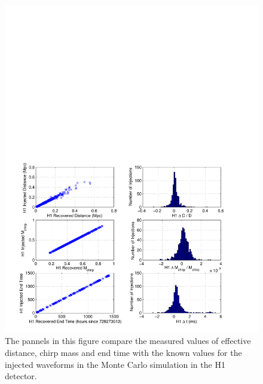 \begin{figure}[p]
\begin{center}
\includegraphics[width=\textwidth]{figures/result/h1_param_error}
\end{center}
\caption[Measurement accuracy of H1 Injection Parameters]{%
\label{f:h1_param_error}%
The pannels in this figure compare the measured values of effective distance,
chirp mass and end time with the known values for the injected waveforms in
the Monte Carlo simulation in the H1 detector.
}
\end{figure}

